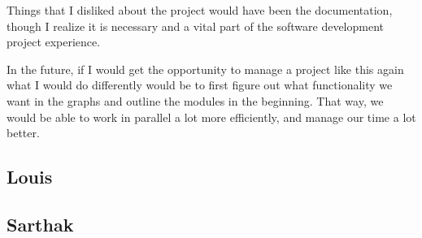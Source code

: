 \documentclass{article}
\begin{document}
Things that I disliked about the project would have been the documentation, though I realize it is necessary and a vital part of the software development project experience. 

In the future, if I would get the opportunity to manage a project like this again what I would do differently would be to first figure out what functionality we want in the graphs and outline the modules in the beginning. That way, we would be able to work in parallel a lot more efficiently, and manage our time a lot better. 
\subsection{Louis}
\subsection{Sarthak}
\end{document}
